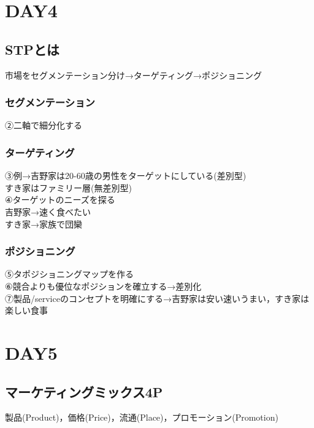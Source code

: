 \documentclass[a4paper,11pt]{ltjsarticle}
\begin{document}
\section{DAY4}
\subsection{STPとは}
市場をセグメンテーション分け→ターゲティング→ポジショニング
\subsubsection{セグメンテーション}
②二軸で細分化する\\
\subsubsection{ターゲティング}
③例→吉野家は20-60歳の男性をターゲットにしている(差別型)\\
すき家はファミリー層(無差別型)\\
④ターゲットのニーズを探る\\
吉野家→速く食べたい\\
すき家→家族で団欒\\
\subsubsection{ポジショニング}
⑤タポジショニングマップを作る\\
⑥競合よりも優位なポジションを確立する→差別化\\
⑦製品/serviceのコンセプトを明確にする→吉野家は安い速いうまい，すき家は楽しい食事
\section{DAY5}
\subsection{マーケティングミックス4P}
製品(Product)，価格(Price)，流通(Place)，プロモーション(Promotion)
\end{document}
